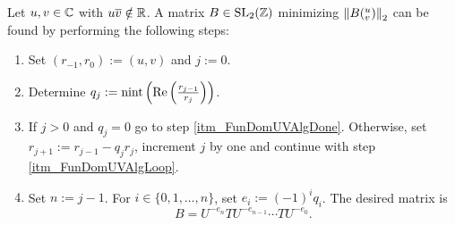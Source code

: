 \begin{theorem}
\label{thm_FunDomUVAlg}
Let $u,v \in \mathbb{C}$ with $u \overline{v} \notin \mathbb{R}$. A matrix $B \in \operatorname{SL}_{2}(\mathbb{Z})$ minimizing $\left\| B ({}^u_v) \right\|_2$ can be found by performing the following steps:
\begin{enumerate}
\item Set $(r_{-1},r_0) := (u,v)$ and $j := 0$.
\item \label{itm_FunDomUVAlgLoop}
Determine $q_j := \operatorname{nint}\left( \operatorname{Re}\left(\frac{r_{j-1}}{r_j}\right) \right)$.
\item If $j > 0$ and $q_j = 0$ go to step \ref{itm_FunDomUVAlgDone}. Otherwise, set $r_{j+1} := r_{j-1} - q_j r_j$, increment $j$ by one and continue with step \ref{itm_FunDomUVAlgLoop}.
\item \label{itm_FunDomUVAlgDone} Set $n := j-1$. For $i \in \{0,1,\dots,n\}$, set $e_i := (-1)^i q_i$. The desired matrix is
\begin{equation}
\label{eqn_FunDomUVMinMat}
B = U^{-e_n} TU^{-e_{n-1}} \cdots TU^{-e_0}.
\end{equation}
\end{enumerate}
\end{theorem}
